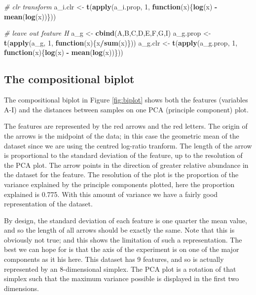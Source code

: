\documentclass[onecolumn]{article}
\newenvironment{Shaded}{\begin{snugshade}}{\end{snugshade}}
\newcommand{\CommentTok}[1]{\textcolor[rgb]{0.56,0.35,0.01}{\textit{#1}}}
\newcommand{\ControlFlowTok}[1]{\textcolor[rgb]{0.13,0.29,0.53}{\textbf{#1}}}
\newcommand{\DecValTok}[1]{\textcolor[rgb]{0.00,0.00,0.81}{#1}}
\newcommand{\KeywordTok}[1]{\textcolor[rgb]{0.13,0.29,0.53}{\textbf{#1}}}
\newcommand{\NormalTok}[1]{#1}
\newcommand{\OperatorTok}[1]{\textcolor[rgb]{0.81,0.36,0.00}{\textbf{#1}}}
\newcommand{\StringTok}[1]{\textcolor[rgb]{0.31,0.60,0.02}{#1}}
\begin{document}
\begin{Shaded}
\begin{Highlighting}[]
\CommentTok{# clr transform}
\NormalTok{a_i.clr <-}\StringTok{ }\KeywordTok{t}\NormalTok{(}\KeywordTok{apply}\NormalTok{(a_i.prop, }\DecValTok{1}\NormalTok{, }\ControlFlowTok{function}\NormalTok{(x)\{}\KeywordTok{log}\NormalTok{(x) }\OperatorTok{-}\StringTok{ }\KeywordTok{mean}\NormalTok{(}\KeywordTok{log}\NormalTok{(x))\}))}

\CommentTok{# leave out feature H}
\NormalTok{a_g <-}\StringTok{ }\KeywordTok{cbind}\NormalTok{(A,B,C,D,E,F,G,I)}
\NormalTok{a_g.prop <-}\StringTok{ }\KeywordTok{t}\NormalTok{(}\KeywordTok{apply}\NormalTok{(a_g, }\DecValTok{1}\NormalTok{, }\ControlFlowTok{function}\NormalTok{(x)\{x}\OperatorTok{/}\KeywordTok{sum}\NormalTok{(x)\}))}
\NormalTok{a_g.clr <-}\StringTok{ }\KeywordTok{t}\NormalTok{(}\KeywordTok{apply}\NormalTok{(a_g.prop, }\DecValTok{1}\NormalTok{, }\ControlFlowTok{function}\NormalTok{(x)\{}\KeywordTok{log}\NormalTok{(x) }\OperatorTok{-}\StringTok{ }\KeywordTok{mean}\NormalTok{(}\KeywordTok{log}\NormalTok{(x))\}))}
\end{Highlighting}
\end{Shaded}

\hypertarget{the-compositional-biplot}{%
\subsection{The compositional biplot}\label{the-compositional-biplot}}

The compositional biplot in Figure \ref{fig:biplot} shows both the features (variables A-I) and the distances between samples on one PCA (principle component) plot.

The features are represented by the red arrows and the red letters. The origin of the arrows is the midpoint of the data; in this case the geometric mean of the dataset since we are using the centred log-ratio tranform. The length of the arrow is proportional to the standard deviation of the feature, up to the resolution of the PCA plot. The arrow points in the direction of greater relative abundance in the dataset for the feature. The resolution of the plot is the proportion of the variance explained by the principle components plotted, here the proportion explained is 0.775. With this amount of variance we have a fairly good representation of the dataset.

By design, the standard deviation of each feature is one quarter the mean value, and so the length of all arrows should be exactly the same. Note that this is obviously not true; and this shows the limitation of such a representation. The best we can hope for is that the axis of the experiment is on one of the major components as it his here. This dataset has 9 features, and so is actually represented by an 8-dimensional simplex. The PCA plot is a rotation of that simplex such that the maximum variance possible is displayed in the first two dimensions.
\end{document}

